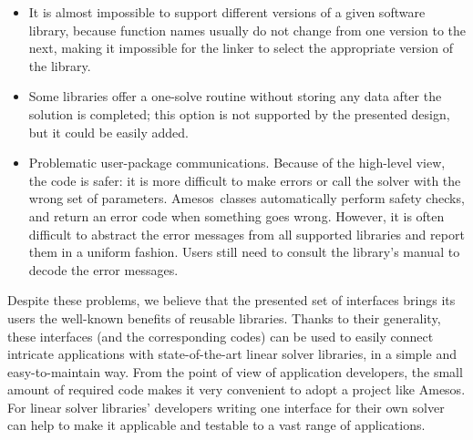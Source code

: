 \documentclass[acmtocl]{acmtrans2m}
\newcommand{\amesos}{{\sc Amesos}}
\begin{document}
\begin{itemize}
\item 
It is almost impossible to support different versions of a given software
library, because
function names usually do not change from one version to the
next, making it impossible for the linker to select the
  appropriate version of the library.

%
%
\item
Some libraries offer a one-solve routine without storing any data after the
solution is completed; this option is not  supported
by the presented design, but it could be easily added.

\item
Problematic user-package communications. Because of the high-level view, the
code is safer: it is more difficult to make errors or call the solver with the
wrong set of parameters. \amesos\ classes automatically perform safety checks,
      and return an error code when something goes wrong. However,
it is often difficult to abstract the error
messages from all supported libraries and report them in a uniform fashion.
Users still need to consult the library's manual to decode the error messages.
\end{itemize}

%

Despite these problems, we believe that the presented set of interfaces
brings its users the well-known benefits of reusable libraries. Thanks to
their generality, these interfaces (and the corresponding codes) can be used to
easily connect intricate applications with state-of-the-art linear solver
libraries, in a simple and easy-to-maintain way. From the point of view of
application developers, the small amount of required code makes it very
convenient to adopt a project like \amesos. For linear solver
libraries' developers  writing one interface for their own solver can help to make it
applicable and testable to a vast range of applications.
\end{document}
